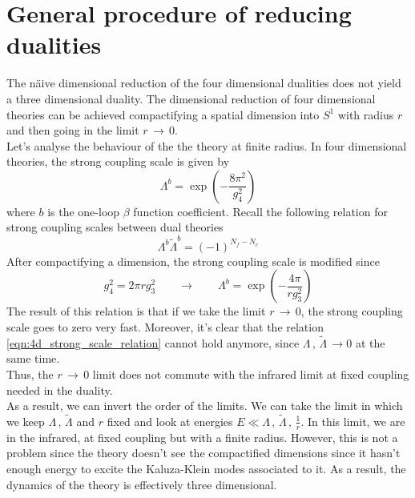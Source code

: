 \section{General procedure of reducing dualities}
The n{\"a}ive dimensional reduction of the four dimensional dualities does not yield a three dimensional duality.
The dimensional reduction of four dimensional theories can be achieved compactifying a spatial dimension into $S^1$ with radius $r$ and then going in the limit $r \, \rightarrow \, 0$. \\
Let's analyse the behaviour of the the theory at finite radius.
In four dimensional theories, the strong coupling scale is given by
\begin{equation}
 \Lambda^{b} = \exp{ \left(  - \frac{8 \pi^2}{g_4^2}\right)}
 \end{equation} 
where $b$ is the one-loop $\beta$ function coefficient.
Recall the following relation for strong coupling scales between dual theories 
\begin{equation}
  \Lambda^{b}  \tilde{\Lambda}^{b} = (-1)^{N_f - N_c}
  \label{eqn:4d_strong_scale_relation}
\end{equation}
After compactifying a dimension, the strong coupling scale is modified \cite{Aharony:2013dha} since  
\begin{equation}
g_4^2 =  2 \pi r g_3^2 \qquad \rightarrow \qquad \Lambda^{b} = \exp{ \left(  - \frac{4 \pi}{ r g_3^2}\right)}
\end{equation}
The result of this relation is that if we take the limit $r \, \rightarrow \, 0$,
the strong coupling scale goes to zero very fast.
Moreover, it's clear that the relation \eqref{eqn:4d_strong_scale_relation} cannot hold anymore, since $\Lambda \, , \, \tilde{\Lambda} \, \rightarrow 0$ at the same time.\\
Thus, the $r \, \rightarrow \, 0$ limit does not commute with the infrared limit at fixed coupling needed in the duality.\\
As a result, we can invert the order of the limits.
We can take the limit in which we keep $\Lambda \, , \, \tilde{\Lambda}$ and $r$ fixed and look at energies $E \ll \Lambda \, , \, \tilde{\Lambda} \,, \, \frac{1}{r}$. 
In this limit, we are in the infrared, at fixed coupling but with a finite radius.
However, this is not a problem since the theory doesn't see the compactified dimensions since it hasn't enough energy to excite the Kaluza-Klein modes associated to it.
As a result, the dynamics of the theory is effectively three dimensional.\\
